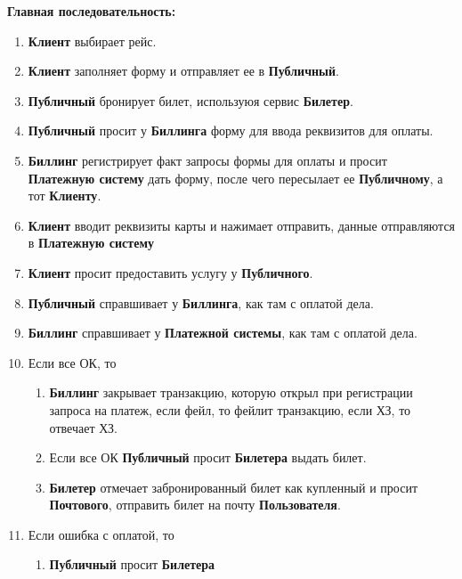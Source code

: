 \textbf{Главная последовательность:} 
\begin{enumerate}
      \item \textbf{Клиент} выбирает рейс.
      \item \textbf{Клиент} заполняет форму и отправляет ее
            в \textbf{Публичный}.
      \item \textbf{Публичный} бронирует билет, используюя
            сервис \textbf{Билетер}.
      \item \textbf{Публичный} просит у \textbf{Биллинга}
            форму для ввода реквизитов для оплаты.
      \item \textbf{Биллинг} регистрирует факт запросы формы
            для оплаты и просит \textbf{Платежную систему}
            дать форму, после чего пересылает ее
            \textbf{Публичному}, а тот \textbf{Клиенту}.
      \item \textbf{Клиент} вводит реквизиты карты и нажимает
            отправить, данные отправляются в 
            \textbf{Платежную систему}
      \item \textbf{Клиент} просит предоставить услугу у
            \textbf{Публичного}.
      \item \textbf{Публичный} справшивает у \textbf{Биллинга},
            как там с оплатой дела.
      \item \textbf{Биллинг} справшивает у \textbf{Платежной системы},
            как там с оплатой дела.
      \item Если все ОК, то
            \begin{enumerate}
                  \item \textbf{Биллинг} закрывает транзакцию, которую
                        открыл при регистрации запроса на платеж,
                        если фейл, то фейлит транзакцию, если ХЗ,
                        то отвечает ХЗ.
                  \item Если все ОК \textbf{Публичный} просит
                        \textbf{Билетера} выдать билет.
                  \item \textbf{Билетер} отмечает забронированный
                        билет как купленный и просит \textbf{Почтового},
                        отправить билет на почту \textbf{Пользователя}.
            \end{enumerate}
      \item Если ошибка с оплатой, то
            \begin{enumerate}
                  \item \textbf{Публичный} просит \textbf{Билетера}

\end{enumerate}
\end{enumerate}

